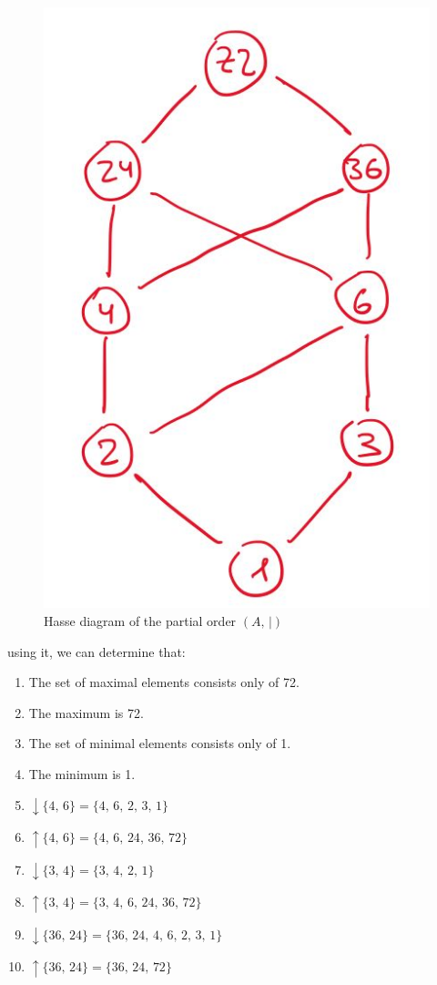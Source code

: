 \documentclass[14pt,a4paper]{extarticle}
\begin{document}
	\begin{figure}[h]
		\centering
		\includegraphics[scale=0.3]{media/hasse_q5.jpg}
		\caption{Hasse diagram of the partial order $(A,\,|)$}
		\label{fig:hasse_q5}
	\end{figure}
	
	
	\noindent using it, we can determine that:
	\begin{enumerate}
		\item The set of maximal elements consists only of 72. 
		\item The maximum is 72. 
		\item The set of minimal elements consists only of 1.  
		\item The minimum is 1. 
		\item $\downarrow\{4,\, 6\} = \{4,\, 6,\, 2,\, 3,\, 1\}$
		\item $\uparrow\{4,\, 6\} = \{4,\, 6,\, 24,\, 36,\, 72\}$ 
		\item $\downarrow\{3,\, 4\} = \{3,\, 4,\, 2,\, 1\}$ 
		\item $\uparrow\{3,\, 4\} = \{3,\, 4,\, 6,\, 24,\, 36,\, 72\}$ 
		\item $\downarrow\{36,\, 24\} = \{36,\, 24,\, 4,\, 6,\, 2,\, 3,\, 1\}$
		\item $\uparrow\{36,\, 24\} = \{36,\, 24,\, 72\}$
	\end{enumerate}
	\newpage
	
\end{document}
